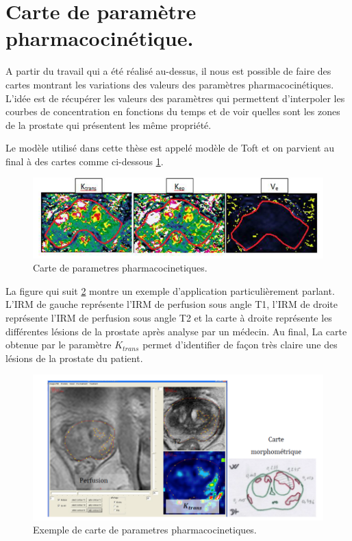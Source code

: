 \section{Carte de paramètre pharmacocinétique.}

A partir du travail qui a été réalisé au-dessus, il nous est possible de faire des cartes montrant les variations des valeurs des paramètres pharmacocinétiques. L'idée est de récupérer les valeurs des paramètres qui permettent d'interpoler les courbes de concentration en fonctions du temps et de voir quelles sont les zones de la prostate qui présentent les même propriété.

\medskip 

Le modèle utilisé dans cette thèse est appelé modèle de Toft et on parvient au final à des cartes comme ci-dessous \ref{fig:CarteDeParametresPharmacocinetique}.

\begin{figure}[H]
\centering
    \includegraphics[scale=0.7,angle=0]{Images/CatreDeParametresPharmacocinetique.png}
    \caption{Carte de parametres pharmacocinetiques.}
    \label{fig:CarteDeParametresPharmacocinetique}
\end{figure}

La figure qui suit \ref{fig:ExempleApplication} montre un exemple d'application particulièrement parlant. L'IRM de gauche représente l'IRM de perfusion sous angle T1, l'IRM de droite représente l'IRM de perfusion sous angle T2 et la carte à droite représente les différentes lésions de la prostate après analyse par un médecin. Au final, La carte obtenue par le paramètre $K_{trans}$ permet d'identifier de façon très claire une des lésions de la prostate du patient.

\begin{figure}[H]
\centering
    \includegraphics[scale=0.6,angle=0]{Images/ExempleApplication.png}
    \caption{Exemple de carte de parametres pharmacocinetiques.}
    \label{fig:ExempleApplication}
\end{figure}

